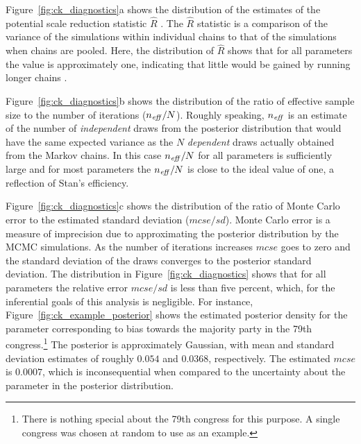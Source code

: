 Figure~{\ref{fig:ck_diagnostics}a} shows the distribution of the estimates of the potential scale reduction statistic $\hat{R}$  . The $\hat{R}$ statistic is a comparison of the variance of the simulations within individual chains to that of the simulations when chains are pooled. Here, the distribution of $\hat{R}$ shows that for all parameters the value is approximately one, indicating that little would be gained by running longer chains . 

Figure~{\ref{fig:ck_diagnostics}b} shows the distribution of the ratio of effective sample size to the number of iterations ($n_{\it eff}/N$). Roughly speaking, $n_{\it eff}$ is an estimate of the number of {\it independent} draws from the posterior distribution that would have the same expected variance as the $N$ {\it dependent} draws actually obtained from the Markov chains. In this case $n_{\it eff}/N$ for all parameters is sufficiently large and for most parameters the $n_{\it eff}/N$ is close to the ideal value of one, a reflection of Stan's efficiency. 


Figure~{\ref{fig:ck_diagnostics}c} shows the distribution of the ratio of Monte Carlo error to the estimated standard deviation ($mcse/sd$). Monte Carlo error is a measure of imprecision due to approximating the posterior distribution by the MCMC simulations. As the number of iterations increases $mcse$ goes to zero and the standard deviation of the draws converges to the posterior standard deviation. The distribution in Figure~\ref{fig:ck_diagnostics} shows that for all parameters the relative error $mcse/sd$ is less than five percent, which, for the inferential goals of this analysis is negligible. For instance, Figure~\ref{fig:ck_example_posterior} shows the estimated posterior density for the parameter corresponding to bias towards the majority party in the 79th congress.\footnote{There is nothing special about the 79th congress for this purpose. A single congress was chosen at random to use as an example.} The posterior is approximately Gaussian, with mean and standard deviation estimates of roughly $0.054$ and $0.0368$, respectively. The estimated $mcse$ is $0.0007$, which is inconsequential when compared to the uncertainty about the parameter in the posterior distribution.   


